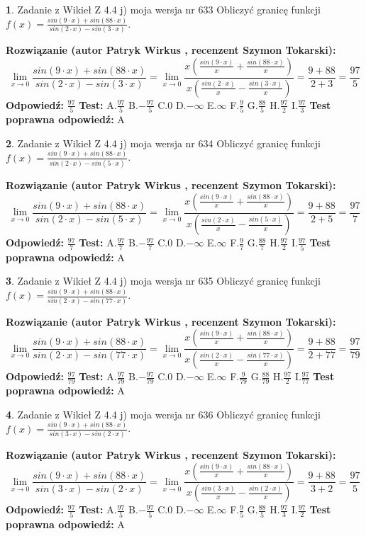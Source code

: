 \documentclass[12pt, a4paper]{article}
\theoremstyle{definition} %
\newtheorem{zad}{}
\newcommand{\zadStart}[1]{\begin{zad}#1\newline}
\newcommand{\zadStop}{\end{zad}}
\newcommand{\rozwStart}[2]{\noindent \textbf{Rozwiązanie (autor #1 , recenzent #2): }\newline}
\newcommand{\rozwStop}{\newline}
\newcommand{\odpStart}{\noindent \textbf{Odpowiedź:}\newline}
\newcommand{\odpStop}{\newline}
\newcommand{\testStart}{\noindent \textbf{Test:}\newline}
\newcommand{\testStop}{\newline}
\newcommand{\kluczStart}{\noindent \textbf{Test poprawna odpowiedź:}\newline}
\newcommand{\kluczStop}{\newline}
\begin{document}
\zadStart{Zadanie z Wikieł Z 4.4 j) moja wersja nr 633}
Obliczyć granicę funkcji $f(x)=\frac{sin(9\cdot x) +sin(88\cdot x)}{sin(2\cdot x) -sin(3\cdot x)}$.
\zadStop
\rozwStart{Patryk Wirkus}{Szymon Tokarski}
$$\lim\limits_{x\to 0}\frac{sin(9\cdot x) +sin(88\cdot x)}{sin(2\cdot x) -sin(3\cdot x)}=\lim\limits_{x\to 0}\frac{x(\frac{sin(9\cdot x)}{x}+\frac{sin(88\cdot x)}{x})}{x(\frac{sin(2\cdot x)}{x}-\frac{sin(3\cdot x)}{x})}=\frac{9+88}{2+3} = \frac{97}{5}$$
\rozwStop
\odpStart
$\frac{97}{5}$
\odpStop
\testStart
A.$\frac{97}{5}$
B.$-\frac{97}{5}$
C.$0$
D.$-\infty$
E.$\infty$
F.$\frac{9}{5}$
G.$\frac{88}{5}$
H.$\frac{97}{2}$
I.$\frac{97}{3}$
\testStop
\kluczStart
A
\kluczStop



\zadStart{Zadanie z Wikieł Z 4.4 j) moja wersja nr 634}
Obliczyć granicę funkcji $f(x)=\frac{sin(9\cdot x) +sin(88\cdot x)}{sin(2\cdot x) -sin(5\cdot x)}$.
\zadStop
\rozwStart{Patryk Wirkus}{Szymon Tokarski}
$$\lim\limits_{x\to 0}\frac{sin(9\cdot x) +sin(88\cdot x)}{sin(2\cdot x) -sin(5\cdot x)}=\lim\limits_{x\to 0}\frac{x(\frac{sin(9\cdot x)}{x}+\frac{sin(88\cdot x)}{x})}{x(\frac{sin(2\cdot x)}{x}-\frac{sin(5\cdot x)}{x})}=\frac{9+88}{2+5} = \frac{97}{7}$$
\rozwStop
\odpStart
$\frac{97}{7}$
\odpStop
\testStart
A.$\frac{97}{7}$
B.$-\frac{97}{7}$
C.$0$
D.$-\infty$
E.$\infty$
F.$\frac{9}{7}$
G.$\frac{88}{7}$
H.$\frac{97}{2}$
I.$\frac{97}{5}$
\testStop
\kluczStart
A
\kluczStop



\zadStart{Zadanie z Wikieł Z 4.4 j) moja wersja nr 635}
Obliczyć granicę funkcji $f(x)=\frac{sin(9\cdot x) +sin(88\cdot x)}{sin(2\cdot x) -sin(77\cdot x)}$.
\zadStop
\rozwStart{Patryk Wirkus}{Szymon Tokarski}
$$\lim\limits_{x\to 0}\frac{sin(9\cdot x) +sin(88\cdot x)}{sin(2\cdot x) -sin(77\cdot x)}=\lim\limits_{x\to 0}\frac{x(\frac{sin(9\cdot x)}{x}+\frac{sin(88\cdot x)}{x})}{x(\frac{sin(2\cdot x)}{x}-\frac{sin(77\cdot x)}{x})}=\frac{9+88}{2+77} = \frac{97}{79}$$
\rozwStop
\odpStart
$\frac{97}{79}$
\odpStop
\testStart
A.$\frac{97}{79}$
B.$-\frac{97}{79}$
C.$0$
D.$-\infty$
E.$\infty$
F.$\frac{9}{79}$
G.$\frac{88}{79}$
H.$\frac{97}{2}$
I.$\frac{97}{77}$
\testStop
\kluczStart
A
\kluczStop



\zadStart{Zadanie z Wikieł Z 4.4 j) moja wersja nr 636}
Obliczyć granicę funkcji $f(x)=\frac{sin(9\cdot x) +sin(88\cdot x)}{sin(3\cdot x) -sin(2\cdot x)}$.
\zadStop
\rozwStart{Patryk Wirkus}{Szymon Tokarski}
$$\lim\limits_{x\to 0}\frac{sin(9\cdot x) +sin(88\cdot x)}{sin(3\cdot x) -sin(2\cdot x)}=\lim\limits_{x\to 0}\frac{x(\frac{sin(9\cdot x)}{x}+\frac{sin(88\cdot x)}{x})}{x(\frac{sin(3\cdot x)}{x}-\frac{sin(2\cdot x)}{x})}=\frac{9+88}{3+2} = \frac{97}{5}$$
\rozwStop
\odpStart
$\frac{97}{5}$
\odpStop
\testStart
A.$\frac{97}{5}$
B.$-\frac{97}{5}$
C.$0$
D.$-\infty$
E.$\infty$
F.$\frac{9}{5}$
G.$\frac{88}{5}$
H.$\frac{97}{3}$
I.$\frac{97}{2}$
\testStop
\kluczStart
A
\kluczStop
\end{document}
